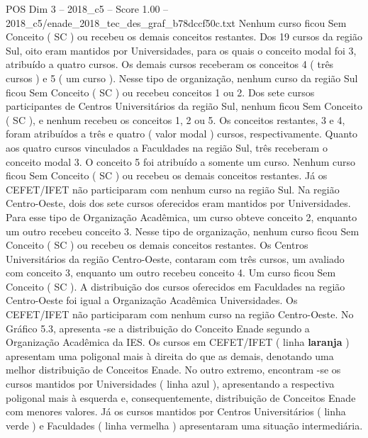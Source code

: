 \begin{textsample}{POS Dim 3 – 2018\_c5 – Score 1.00 – 2018\_c5/enade\_2018\_tec\_des\_graf\_b78dccf50c.txt}
Nenhum curso ficou Sem Conceito ( SC ) ou recebeu os demais conceitos restantes.
Dos 19 cursos da região Sul, oito eram mantidos por Universidades, para os quais o conceito modal foi 3, atribuído a quatro cursos.
Os demais cursos receberam os conceitos 4 ( três cursos ) e 5 ( um curso ).
Nesse tipo de organização, nenhum curso da região Sul ficou Sem Conceito ( SC ) ou recebeu conceitos 1 ou 2.
Dos sete cursos participantes de Centros Universitários da região Sul, nenhum ficou Sem Conceito ( SC ), e nenhum recebeu os conceitos 1, 2 ou 5.
Os conceitos restantes, 3 e 4, foram atribuídos a três e quatro ( valor modal ) cursos, respectivamente.
Quanto aos quatro cursos vinculados a Faculdades na região Sul, três receberam o conceito modal 3.
O conceito 5 foi atribuído a somente um curso.
Nenhum curso ficou Sem Conceito ( SC ) ou recebeu os demais conceitos restantes.
Já os CEFET/IFET não participaram com nenhum curso na região Sul.
Na região Centro-Oeste, dois dos sete cursos oferecidos eram mantidos por Universidades.
Para esse tipo de Organização Acadêmica, um curso obteve conceito 2, enquanto um outro recebeu conceito 3.
Nesse tipo de organização, nenhum curso ficou Sem Conceito ( SC ) ou recebeu os demais conceitos restantes.
Os Centros Universitários da região Centro-Oeste, contaram com três cursos, um avaliado com conceito 3, enquanto um outro recebeu conceito 4.
Um curso ficou Sem Conceito ( SC ).
A distribuição dos cursos oferecidos em Faculdades na região Centro-Oeste foi igual a Organização Acadêmica Universidades.
Os CEFET/IFET não participaram com nenhum curso na região Centro-Oeste.
No Gráfico 5.3, apresenta -se a distribuição do Conceito Enade segundo a Organização Acadêmica da IES.
Os cursos em CEFET/IFET ( linha \textbf{laranja} ) apresentam uma poligonal mais à direita do que as demais, denotando uma melhor distribuição de Conceitos Enade.
No outro extremo, encontram -se os cursos mantidos por Universidades ( linha azul ), apresentando a respectiva poligonal mais à esquerda e, consequentemente, distribuição de Conceitos Enade com menores valores.
Já os cursos mantidos por Centros Universitários ( linha verde ) e Faculdades ( linha vermelha ) apresentaram uma situação intermediária.

\end{textsample}
